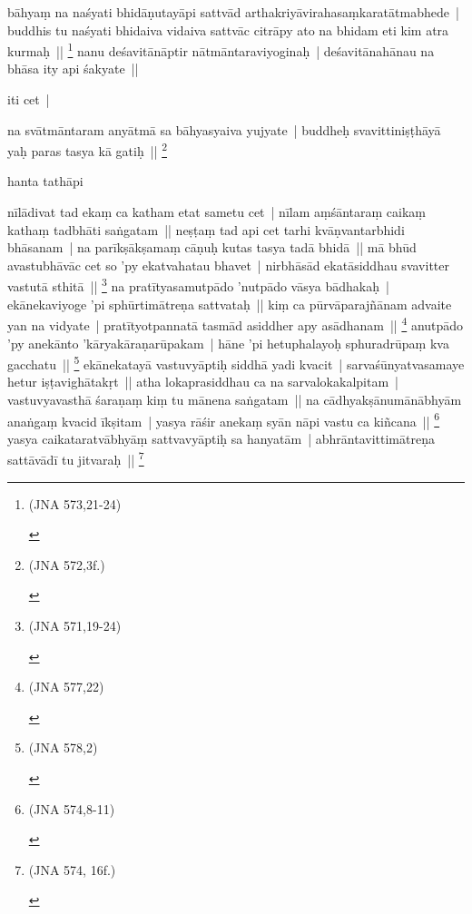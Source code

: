 \documentclass[article,a4paper]{memoir}
\begin{document}
	  \pstart bā\-hyaṃ na naśyati bhidā\-ṇutayā\-pi sattvā\-d arthakriyā\-virahasaṃkaratā\-tmabhede | buddhis tu naśyati bhidaiva vidaiva sattvā\-c citrā\-py ato na bhidam eti kim atra kurmaḥ || \footnote{\begin{english}(JNA 573,21-24)\end{english}} nanu deśavitā\-nā\-ptir nā\-tmā\-ntaraviyoginaḥ | deśavitā\-nahā\-nau na bhā\-sa ity api śakyate ||
	\pend
      

	  \pstart iti cet |
	\pend
      

	  \pstart na svā\-tmā\-ntaram anyā\-tmā\- sa bā\-hyasyaiva yujyate | buddheḥ svavittiniṣṭhā\-yā\- yaḥ paras tasya kā\- gatiḥ || \footnote{\begin{english}(JNA 572,3f.)\end{english}}
	\pend
      

	  \pstart hanta tathā\-pi
	\pend
      

	  \pstart nī\-lā\-divat tad ekaṃ ca katham etat sametu cet | nī\-lam aṃśā\-ntaraṃ caikaṃ kathaṃ tadbhā\-ti saṅgatam || neṣṭaṃ tad api cet tarhi kvā\-ṇvantarbhidi bhā\-sanam | na parī\-kṣā\-kṣamaṃ cā\-ṇuḥ kutas tasya tadā\- bhidā\- || mā\- bhū\-d avastubhā\-vā\-c cet so 'py ekatvahatau bhavet | nirbhā\-sā\-d ekatā\-siddhau svavitter vastutā\- sthitā\- || \footnote{\begin{english}(JNA 571,19-24)\end{english}} na pratī\-tyasamutpā\-do 'nutpā\-do vā\-sya bā\-dhakaḥ | ekā\-nekaviyoge 'pi sphū\-rtimā\-treṇa sattvataḥ || kiṃ ca pū\-rvā\-parajñā\-nam advaite yan na vidyate | pratī\-tyotpannatā\- tasmā\-d asiddher apy asā\-dhanam || \footnote{\begin{english}(JNA 577,22)\end{english}} anutpā\-do 'py anekā\-nto 'kā\-ryakā\-raṇarū\-pakam | hā\-ne 'pi hetuphalayoḥ sphuradrū\-paṃ kva gacchatu || \footnote{\begin{english}(JNA 578,2)\end{english}} ekā\-nekatayā\- vastuvyā\-ptiḥ siddhā\- yadi kvacit | sarvaśū\-nyatvasamaye hetur iṣṭavighā\-takṛt || atha lokaprasiddhau ca na sarvalokakalpitam | vastuvyavasthā\- śaraṇaṃ kiṃ tu mā\-nena saṅgatam || na cā\-dhyakṣā\-numā\-nā\-bhyā\-m anaṅgaṃ kvacid ī\-kṣitam | yasya rā\-śir anekaṃ syā\-n nā\-pi vastu ca kiñcana || \footnote{\begin{english}(JNA 574,8-11)\end{english}} yasya caikataratvā\-bhyā\-ṃ sattvavyā\-ptiḥ sa hanyatā\-m | abhrā\-ntavittimā\-treṇa sattā\-vā\-dī\- tu jitvaraḥ || \footnote{\begin{english}(JNA 574, 16f.)\end{english}}
	\pend
      
\end{document}
